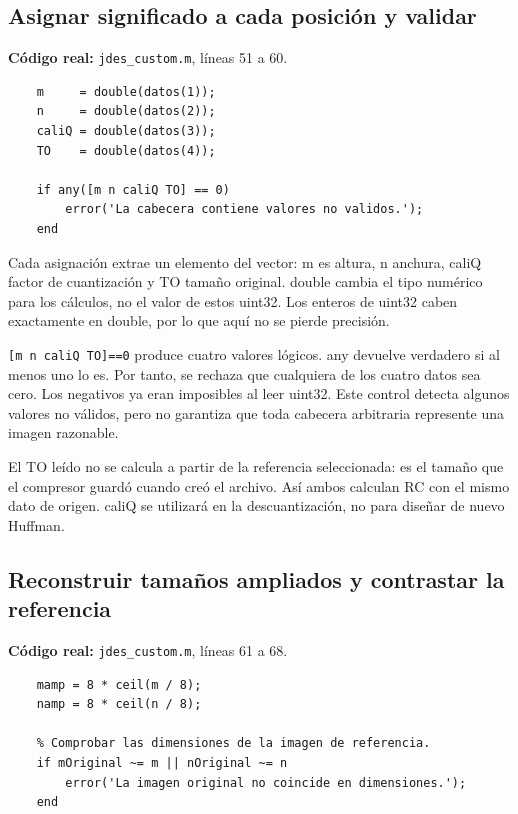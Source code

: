 \documentclass[11pt,a4paper,oneside]{report}
\begin{document}
\par\medskip\noindent\begin{minipage}{\linewidth}

\subsection{Asignar significado a cada posición y validar}

\textbf{Código real:} \texttt{jdes\_custom.m}, líneas 51 a 60.

\begin{lstlisting}[firstnumber=51]
    % Convertir a double para los calculos posteriores.
    m     = double(datos(1));
    n     = double(datos(2));
    caliQ = double(datos(3));
    TO    = double(datos(4));

    if any([m n caliQ TO] == 0)
        error('La cabecera contiene valores no validos.');
    end

\end{lstlisting}

\end{minipage}\par


Cada asignación extrae un elemento del vector: m es altura, n anchura,
caliQ factor de cuantización y TO tamaño original. double cambia el tipo
numérico para los cálculos, no el valor de estos uint32. Los enteros de
uint32 caben exactamente en double, por lo que aquí no se pierde precisión.

\texttt{[m n caliQ TO]==0} produce cuatro valores lógicos. any devuelve
verdadero si al menos uno lo es. Por tanto, se rechaza que cualquiera de
los cuatro datos sea cero. Los negativos ya eran imposibles al leer uint32.
Este control detecta algunos valores no válidos, pero no garantiza que toda
cabecera arbitraria represente una imagen razonable.

El TO leído no se calcula a partir de la referencia seleccionada: es el
tamaño que el compresor guardó cuando creó el archivo. Así ambos calculan RC
con el mismo dato de origen. caliQ se utilizará en la descuantización,
no para diseñar de nuevo Huffman.


\par\medskip\noindent\begin{minipage}{\linewidth}

\subsection{Reconstruir tamaños ampliados y contrastar la referencia}

\textbf{Código real:} \texttt{jdes\_custom.m}, líneas 61 a 68.

\begin{lstlisting}[firstnumber=61]
    % Recuperar las dimensiones ampliadas.
    mamp = 8 * ceil(m / 8);
    namp = 8 * ceil(n / 8);

    % Comprobar las dimensiones de la imagen de referencia.
    if mOriginal ~= m || nOriginal ~= n
        error('La imagen original no coincide en dimensiones.');
    end
\end{lstlisting}

\end{minipage}\par
\end{document}
